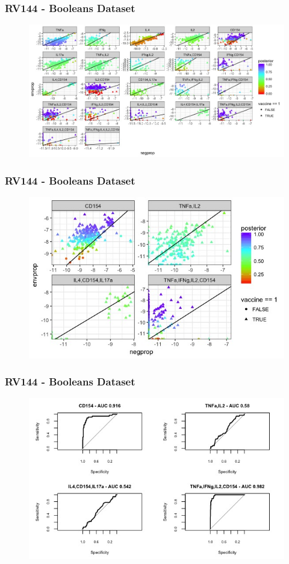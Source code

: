 \documentclass{beamer}
\theoremstyle{definition}
\begin{document}
\begin{frame}
\frametitle{RV144 - Booleans Dataset}
\begin{figure}[]
\includegraphics[width=12 cm]{figures/booleansFullScatter}
\end{figure}
\end{frame}


\begin{frame}
\frametitle{RV144 - Booleans Dataset}
\begin{figure}[]
\includegraphics[width=12 cm]{figures/booleansScatterLess} 
\end{figure}
\end{frame}


\begin{frame}
\frametitle{RV144 - Booleans Dataset}
\begin{figure}[]
\includegraphics[width=12 cm]{figures/BooleansROCless}
\end{figure}
\end{frame}
\end{document}
